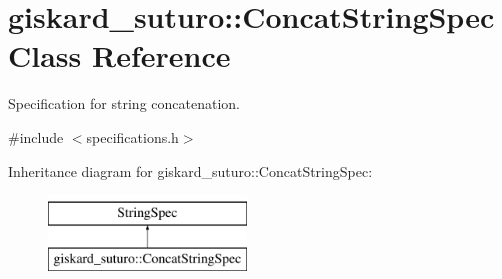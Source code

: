 \hypertarget{classgiskard__suturo_1_1ConcatStringSpec}{\section{giskard\-\_\-suturo\-:\-:Concat\-String\-Spec Class Reference}
\label{classgiskard__suturo_1_1ConcatStringSpec}
}


Specification for string concatenation.  




{\ttfamily \#include $<$specifications.\-h$>$}

Inheritance diagram for giskard\-\_\-suturo\-:\-:Concat\-String\-Spec\-:\begin{figure}[H]
\begin{center}
\leavevmode
\includegraphics[height=2.000000cm]{classgiskard__suturo_1_1ConcatStringSpec}
\end{center}
\end{figure}

